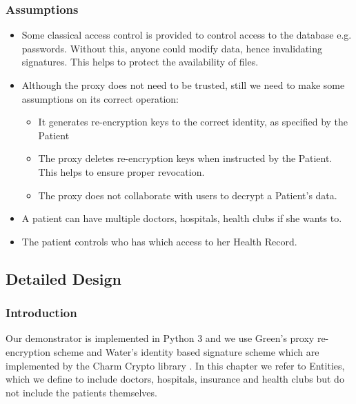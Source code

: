 \documentclass[]{article}
\begin{document}
\begin{itemize}
\subsubsection{Assumptions}
\begin{itemize}
\item Some classical access control is provided to control access to the database e.g. passwords. Without this, anyone could modify data, hence invalidating signatures. This helps to protect the availability of files.
\item Although the proxy does not need to be trusted, still we need to make some assumptions on its correct operation:
\begin{itemize}
\item It generates re-encryption keys to the correct identity, as specified by the Patient
\item The proxy deletes re-encryption keys when instructed by the Patient. This helps to ensure proper revocation.
\item The proxy does not collaborate with users to decrypt a Patient's data.
\end{itemize}
\item A patient can have multiple doctors, hospitals, health clubs if she wants to.
\item The patient controls who has which access to her Health Record.
\end{itemize}

\subsection{Detailed Design}
\subsubsection{Introduction}
Our demonstrator is implemented in Python 3 and we use Green's proxy re-encryption scheme \cite{green2007identity} and Water's identity based signature scheme \cite{waters2005efficient} which are implemented by the Charm Crypto library \cite{charm13}. In this chapter we refer to Entities, which we define to include doctors, hospitals, insurance and health clubs but do not include the patients themselves.


\end{itemize}
\end{document}

